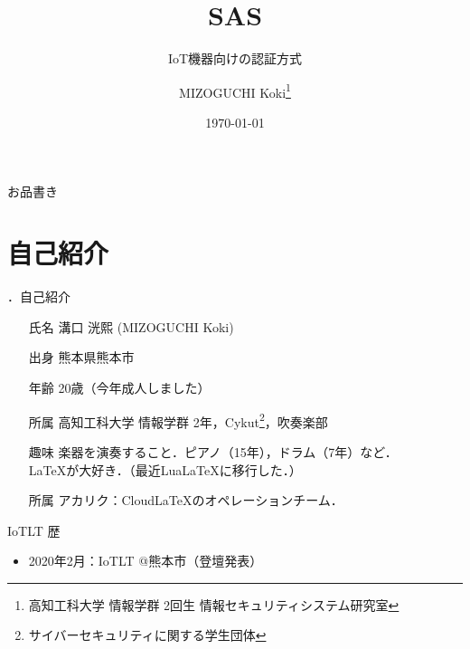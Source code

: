 \documentclass[aspectratio=43]{beamer}
\title{SAS}
\subtitle{IoT機器向けの認証方式}
\author[K.MIZOGUCHI]{MIZOGUCHI Koki\thanks{高知工科大学 情報学群 2回生 情報セキュリティシステム研究室}}
\date{\today}
\institute[KUT]{Kochi University of Technology}
\newcommand{\showsec}{\thesection ．}
\begin{document}
\begin{frame}
    \titlepage
\end{frame}
\begin{frame}{お品書き}
    \tableofcontents
\end{frame}
\section{自己紹介}
\begin{frame}{\showsec 自己紹介}
    \begin{block}{}
        \begin{itemize}
            \setlength{\leftskip}{2\zw}
            \item[氏名] 溝口 洸熙 (MIZOGUCHI Koki)
            \item[出身] 熊本県熊本市
            \item[年齢] 20歳（今年成人しました）
            \item[所属] 高知工科大学 情報学群 2年，Cykut\footnote{サイバーセキュリティに関する学生団体}，吹奏楽部
            \item[趣味] 楽器を演奏すること．ピアノ（15年），ドラム（7年）など． \\\vspace{1em}
                {\LARGE LaTeX}が大好き．（最近Lua\LaTeX に移行した．）\\
                \dotfill
            \item[所属] アカリク：Cloud\LaTeX のオペレーションチーム．
        \end{itemize}
    \end{block}
    \begin{block}{IoTLT 歴}
        \begin{itemize}
            \item 2020年2月：IoTLT @熊本市（登壇発表）
        \end{itemize}
    \end{block}
\end{frame}
\end{document}
